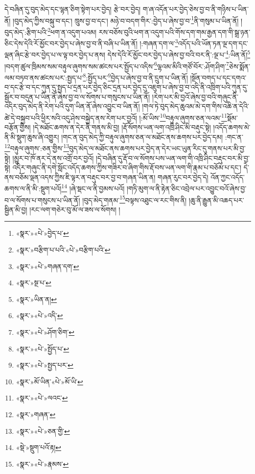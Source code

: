 དེ་བཞིན་དུ་བུད་མེད་དང་ལྷན་ཅིག་སྟེག་པར་བྱེད། རྩེ་བར་བྱེད། ག་ཞ་འདོན་པར་བྱེད་ཅེས་བྱ་བ་ནི་གཉིས་པ་ཡིན་ནོ། །བུད་མེད་ཀྱིས་བསྐུ་བ་དང་། ཁྲུས་བྱ་བ་དང་། མཉེ་བ་བདག་གིར་:བྱེད་པ་ཞེས་བྱ་བ་\footnote{«སྣར་»«པེ་»བྱེད་པ་}ནི་གསུམ་པ་ཡིན་ནོ། །བུད་མེད་:རྩིག་པའི་\footnote{«སྣར་»བརྩིག་པ་པའི་«པེ་»བརྩིག་པའི་}ཕག་ན་འདུག་པའམ། རས་བཅོས་བུའི་ཕག་ན་འདུག་པའི་གོས་དག་གམ་རྒྱན་དག་གི་སྒྲ་ཉན་ཅིང་དེས་དེའི་རོ་མྱོང་བར་བྱེད་པ་ཞེས་བྱ་བ་ནི་བཞི་པ་ཡིན་ནོ། །:གཞན་དག་ལ་\footnote{«སྣར་»«པེ་»གཞན་དག་}འདོད་པའི་ཡོན་ཏན་ལྔ་དག་དང་ལྡན་ཞིང་རྩེ་བར་བྱེད་པ་ལ་ལྟ་བར་བྱེད་པ་ནས། དེས་དེའི་རོ་མྱོང་བར་བྱེད་པ་ཞེས་བྱ་བའི་བར་ནི་:ལྔ་པ་\footnote{«སྣར་»སྔ་པ་}:ཡིན་ནོ།\footnote{«སྣར་»ཡིན་ན།} །བདག་ཚུལ་ཁྲིམས་སམ་བརྟུལ་ཞུགས་སམ་ཚངས་པར་སྤྱོད་པ་འདིས་\footnote{«སྣར་»«པེ་»འདི་}ལྷའམ་མིའི་གཙོ་བོར་:ཤོག་ཤིག་\footnote{«སྣར་»«པེ་»ཤོག་ཅིག་}ཅེས་སྨོན་ལམ་བཏབ་ནས་ཚངས་པར་:སྤྱད་པ་\footnote{«སྣར་»«པེ་»སྤྱོད་པ་}:སྤྱོད་པར་\footnote{«སྣར་»«པེ་»སྤྱད་པར་}བྱེད་པ་ཞེས་བྱ་བ་ནི་དྲུག་པ་ཡིན་ནོ། །སྔོན་བགད་པ་དང་དགའ་བ་དང་རྩེ་བ་དང་ཀུན་དུ་སྤྱད་པ་དྲན་པར་བྱེད་ཅིང་དྲན་པར་བྱེད་དུ་འཇུག་པ་ཞེས་བྱ་བ་འདི་ནི་འཁྲིག་པའི་ཀུན་དུ་སྦྱོར་བ་བདུན་པ་ཡིན་ནོ་ཞེས་བྱ་བ་ལ་སོགས་པ་གསུངས་པ་ཡིན་ནོ། །རེག་པར་མི་བྱའོ་ཞེས་བྱ་བའི་གཞུང་ནི་འདིར་བུད་མེད་ནི་རེག་པའི་དུག་ཡིན་ནོ་ཞེས་འབྱུང་བ་ཡིན་ནོ། །གལ་ཏེ་བུད་མེད་ཆུའམ་མེ་དག་གིས་འཆི་ན་དེའི་ཚེ་དེ་བསྐྱབ་པའི་ཕྱིར་སའི་འདུ་ཤེས་བསྐྱེད་ནས་རེག་པར་བྱའོ། །:མོ་ཡིས་\footnote{«སྣར་»མོ་ཡིན་«པེ་»མོ་ཡི་}བརྟུལ་ཞུགས་ཅན་ལའམ་\footnote{«སྣར་»«པེ་»ལའང་}སྡོམ་བརྩོན་གྱིས། །དེ་མཐོང་ཆགས་ན་དེར་ནི་གནས་མི་བྱ། །རྡོ་སོགས་ཡན་ལག་འཁྲི་ཤིང་མི་བརྡུང་སྟེ། །འདོད་ཆགས་མེ་ནི་མི་སྡུག་ཆུས་ཞི་འགྱུར། །གང་ན་བུད་མེད་ཀྱི་བརྟུལ་ཞུགས་ཅན་ལ་མཐོང་ནས་ཆགས་པར་བྱེད་དམ། :གང་ན་\footnote{«སྣར་»གཞན་}བརྟུལ་ཞུགས་:ཅན་གྱིས་\footnote{«སྣར་»«པེ་»ཅན་གྱི་}བུད་མེད་ལ་མཐོང་ནས་ཆགས་པར་བྱེད་ན་དེར་ཡང་ཡུན་རིང་དུ་གནས་པར་མི་བྱ་སྟེ། །མྱུར་བ་ཁོ་ནར་དེ་ནས་འགྲོ་བར་བྱའོ། །དེ་བཞིན་དུ་རྡོ་བ་ལ་སོགས་པས་ཡན་ལག་གི་འཁྲི་ཤིང་བརྡུང་བར་མི་བྱ་སྟེ། འདིར་གཞུང་ནི་དགེ་སློང་འདོད་ཆགས་ཀྱིས་གཟིར་བ་ཞིག་གིས་རྡོ་བས་ཡན་ལག་གི་རྣམ་པ་བཅོམ་པ་དང་། དེ་ནས་བཅོམ་ལྡན་འདས་ཀྱིས་ཇི་ལྟར་ན་བརྡུང་བར་བྱ་བ་གཞན་ཡིན་ན། གཞན་རུང་བར་བྱེད་དེ། འོན་ཀྱང་འདོད་ཆགས་ལ་ནི་མི་:སྡུག་པའོ།\footnote{«སྡེ་»སྡུག་པའོ་རྟ།} །ཞེ་སྡང་ལ་ནི་བྱམས་པའོ། །གཏི་མུག་ལ་ནི་རྟེན་ཅིང་འབྲེལ་པར་འབྱུང་བའོ་ཞེས་བྱ་བ་ལ་སོགས་པ་གསུངས་པ་ཡིན་ནོ། །བུད་མེད་གནམ་\footnote{«སྣར་»«པེ་»རྣམས་}བལྟས་འཐུང་ལ་རང་གིས་ནི། །ཆུ་ནི་རྒྱུན་མི་འཆད་པར་སྦྱིན་མི་བྱ། །རང་ལག་གཅེར་བུ་མོ་ལ་ཟས་ལ་སོགས། །
